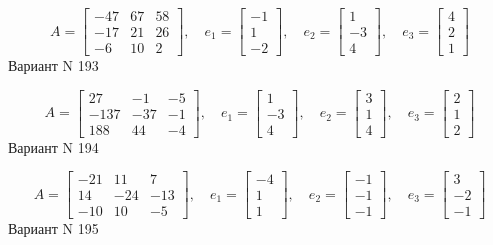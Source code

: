 \documentclass[11pt]{report}
\begin{document}
$$A = \left[\begin{matrix}-47 & 67 & 58\\-17 & 21 & 26\\-6 & 10 & 2\end{matrix}\right],\quad e_1 = \left[\begin{matrix}-1\\1\\-2\end{matrix}\right],\quad e_2 = \left[\begin{matrix}1\\-3\\4\end{matrix}\right],\quad e_3 = \left[\begin{matrix}4\\2\\1\end{matrix}\right]$$Вариант N 193

$$A = \left[\begin{matrix}27 & -1 & -5\\-137 & -37 & -1\\188 & 44 & -4\end{matrix}\right],\quad e_1 = \left[\begin{matrix}1\\-3\\4\end{matrix}\right],\quad e_2 = \left[\begin{matrix}3\\1\\4\end{matrix}\right],\quad e_3 = \left[\begin{matrix}2\\1\\2\end{matrix}\right]$$Вариант N 194

$$A = \left[\begin{matrix}-21 & 11 & 7\\14 & -24 & -13\\-10 & 10 & -5\end{matrix}\right],\quad e_1 = \left[\begin{matrix}-4\\1\\1\end{matrix}\right],\quad e_2 = \left[\begin{matrix}-1\\-1\\-1\end{matrix}\right],\quad e_3 = \left[\begin{matrix}3\\-2\\-1\end{matrix}\right]$$Вариант N 195
\end{document}
